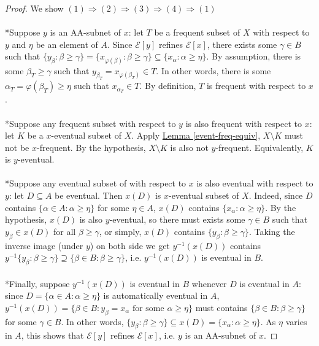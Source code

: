\documentclass{treatise}
\begin{document}
\begin{proof}
We show $(1) \Rightarrow (2) \Rightarrow (3) \Rightarrow (4) \Rightarrow (1)$
\\
\\
*Suppose $y$ is an AA-subnet of $x$: let $T$ be a frequent subset of $X$ with respect to $y$ and $\eta$ be an element of $A$. Since $\mathcal{E}[y]$ refines $\mathcal{E}[x]$, there exists some $\gamma \in B$ such that $\{ y_\beta : \beta \geq \gamma \} = \{ x_{\varphi(\beta)} : \beta \geq \gamma \} \subseteq \{ x_\alpha : \alpha \geq \eta \}$. By assumption, there is some $\beta_T \geq \gamma$ such that $y_{\beta_T} = x_{\varphi(\beta_T)} \in T$. In other words, there is some $\alpha_T = \varphi(\beta_T) \geq \eta$ such that $x_{\alpha_T} \in T$. By definition, $T$ is frequent with respect to $x$.
\\
\\
*Suppose any frequent subset with respect to $y$ is also frequent with respect to $x$: let $K$ be a $x$-eventual subset of $X$. Apply \hyperref[event-freq-equiv]{Lemma \ref*{event-freq-equiv}}, $X \setminus K$ must not be $x$-frequent. By the hypothesis, $X \setminus K$ is also not $y$-frequent. Equivalently, $K$ is $y$-eventual.
\\
\\
*Suppose any eventual subset of with respect to $x$ is also eventual with respect to $y$: let $D \subseteq A$ be eventual. Then $x(D)$ is $x$-eventual subset of $X$. Indeed, since $D$ contains $\{ \alpha \in A : \alpha \geq \eta \}$ for some $\eta \in A$, $x(D)$ contains $\{ x_\alpha : \alpha \geq \eta \}$. By the hypothesis, $x(D)$ is also $y$-eventual, so there must exists some $\gamma \in B$ such that $y_\beta \in x(D)$ for all $\beta \geq \gamma$, or simply, $x(D)$ contains $\{ y_\beta : \beta \geq \gamma \}$. Taking the inverse image (under $y$) on both side we get $y^{-1}(x(D))$ contains $y^{-1}\{ y_\beta : \beta \geq \gamma \} \supseteq \{ \beta \in B : \beta \geq \gamma \}$, i.e. $y^{-1}(x(D))$ is eventual in $B$.
\\
\\
*Finally, suppose $y^{-1}(x(D))$ is eventual in $B$ whenever $D$ is eventual in $A$: since $D = \{ \alpha \in A : \alpha \geq \eta \}$ is automatically eventual in $A$, $y^{-1}(x(D)) = \{ \beta \in B : y_\beta = x_\alpha \mbox{ for some } \alpha \geq \eta \}$ must contains $\{ \beta \in B : \beta \geq \gamma \}$ for some $\gamma \in B$. In other words, $\{ y_\beta : \beta \geq \gamma \} \subseteq x(D) = \{ x_\alpha : \alpha \geq \eta \}$. As $\eta$ varies in $A$, this shows that $\mathcal{E}[y]$ refines $\mathcal{E}[x]$, i.e. $y$ is an AA-subnet of $x$.
\end{proof}
\end{document}
